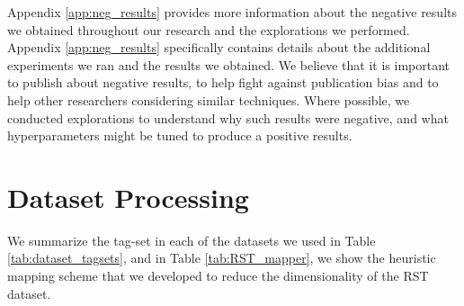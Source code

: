 \documentclass[11pt]{article}
\begin{document}
Appendix \ref{app:neg_results}
provides more information about the negative results we obtained throughout our research and the explorations we performed. Appendix \ref{app:neg_results} specifically contains details about the additional experiments we ran and the results we obtained. We believe that it is important to publish about negative results, to help fight against publication bias \cite{easterbrook1991publication} and to help other researchers considering similar techniques. Where possible, we conducted explorations to understand why such results were negative, and what hyperparameters might be tuned to produce a positive results.

\section{Dataset Processing}
\label{app:datasets}

We summarize the tag-set in each of the datasets we used in Table \ref{tab:dataset_tagsets}, and in Table \ref{tab:RST_mapper}, we show the heuristic mapping scheme that we developed to reduce the dimensionality of the RST dataset.
\end{document}
